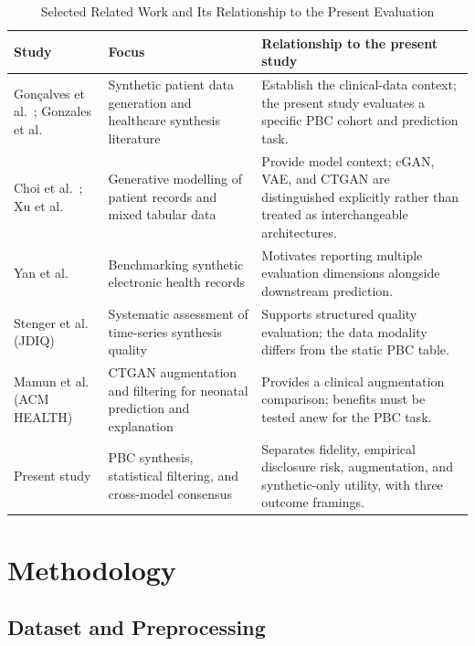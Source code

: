 \documentclass[journal]{IEEEtran}
\begin{document}
\begin{table}[!t]
\centering
\caption{Selected Related Work and Its Relationship to the Present Evaluation}
\label{tab:related}
\footnotesize
\begin{tabular}{p{}p{}p{}}
\toprule
Study & Focus & Relationship to the present study \\
\midrule
Gon\c{c}alves et al.\ \cite{goncalves2020}; Gonzales et al.\ \cite{gonzales2023} & Synthetic patient data generation and healthcare synthesis literature & Establish the clinical-data context; the present study evaluates a specific PBC cohort and prediction task. \\
Choi et al.\ \cite{choi2017}; Xu et al.\ \cite{xu2019} & Generative modelling of patient records and mixed tabular data & Provide model context; cGAN, VAE, and CTGAN are distinguished explicitly rather than treated as interchangeable architectures. \\
Yan et al.\ \cite{yan2022} & Benchmarking synthetic electronic health records & Motivates reporting multiple evaluation dimensions alongside downstream prediction. \\
Stenger et al.\ \cite{stenger2024} (JDIQ) & Systematic assessment of time-series synthesis quality & Supports structured quality evaluation; the data modality differs from the static PBC table. \\
Mamun et al.\ \cite{mamun2026} (ACM HEALTH) & CTGAN augmentation and filtering for neonatal prediction and explanation & Provides a clinical augmentation comparison; benefits must be tested anew for the PBC task. \\
Present study & PBC synthesis, statistical filtering, and cross-model consensus & Separates fidelity, empirical disclosure risk, augmentation, and synthetic-only utility, with three outcome framings. \\
\bottomrule
\end{tabular}
\end{table}

\FloatBarrier
\section{Methodology}
\label{sec:methodology}

\subsection{Dataset and Preprocessing}
\end{document}
